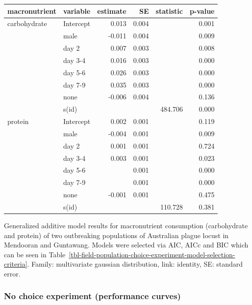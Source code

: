 \documentclass[
]{article}
\begin{document}
\begin{tbl}

\begin{minipage}{\linewidth}

\begingroup
\fontsize{12.0pt}{14.4pt}\selectfont
\begin{longtable*}{llrrrr}
\toprule
macronutrient & variable & estimate & SE & statistic & p-value \\ 
\midrule\addlinespace[2.5pt]
carbohydrate & Intercept & 0.013 & 0.004 &  & 0.001 \\ 
 & male & -0.011 & 0.004 &  & 0.009 \\ 
 & day 2 & 0.007 & 0.003 &  & 0.008 \\ 
 & day 3-4 & 0.016 & 0.003 &  & 0.000 \\ 
 & day 5-6 & 0.026 & 0.003 &  & 0.000 \\ 
 & day 7-9 & 0.035 & 0.003 &  & 0.000 \\ 
 & none & -0.006 & 0.004 &  & 0.136 \\ 
 & s(id) &  &  & 484.706 & 0.000 \\ 
protein & Intercept & 0.002 & 0.001 &  & 0.119 \\ 
 & male & -0.004 & 0.001 &  & 0.009 \\ 
 & day 2 & 0.001 & 0.001 &  & 0.724 \\ 
 & day 3-4 & 0.003 & 0.001 &  & 0.023 \\ 
 & day 5-6 &  & 0.001 &  & 0.000 \\ 
 & day 7-9 &  & 0.001 &  & 0.000 \\ 
 & none & -0.001 & 0.001 &  & 0.475 \\ 
 & s(id) &  &  & 110.728 & 0.381 \\ 
\bottomrule
\end{longtable*}
\endgroup

\end{minipage}%

\caption{\label{tbl-field-population-it-model}Generalized additive model
results for macronutrient consumption (carbohydrate and protein) of two
outbreaking populations of Australian plague locust in Mendooran and
Guntawang. Models were selected via AIC, AICc and BIC which can be seen
in
Table~\ref{tbl-field-population-choice-experiment-model-selection-criteria}.
Family: multivariate gaussian distribution, link: identity, SE: standard
error.}

\end{tbl}%

\subsubsection{No choice experiment (performance
curves)}\label{no-choice-experiment-performance-curves}
\end{document}
